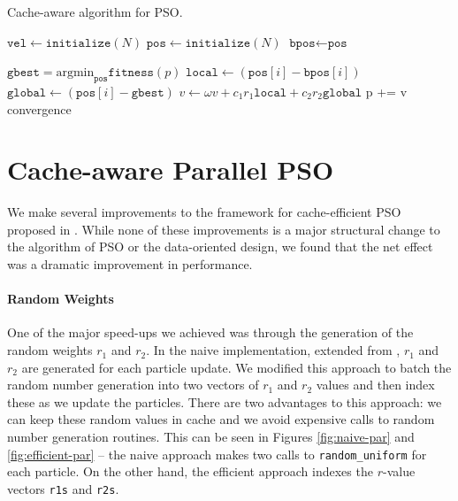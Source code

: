 \begin{algorithm}
  \caption{Cache-aware algorithm for PSO.}\label{alg:pso-cache}
  \begin{algorithmic}[1]
    \State $\texttt{vel} \gets \texttt{initialize}(N)$ 
    \State $\texttt{pos} \gets \texttt{initialize}(N)$ 
    \State $\texttt{bpos} \gets \texttt{pos}$ 

    \Repeat
    \State $\texttt{gbest} = \text{argmin}_{\texttt{pos}}\texttt{fitness}(p)$
    \State $\texttt{local} \gets (\texttt{pos}[i] -
    \texttt{bpos}[i])$
    \State $\texttt{global} \gets  (\texttt{pos}[i]
    - \texttt{gbest})$
    \State $v \gets \omega v + c_1 r_1 \texttt{local}  + c_2 r_2 \texttt{global}$
    \EndFor
    \State p += v
    \EndFor
    \Until convergence
    \EndProcedure
  \end{algorithmic}
\end{algorithm}

\section{Cache-aware Parallel PSO}\label{sec:algo}
We make several improvements to the framework for cache-efficient PSO proposed
in \cite{cache-pso}. While none of these improvements is a major structural
change to the algorithm of PSO or the data-oriented design, we found that the
net effect was a dramatic improvement in performance.

\paragraph{Random Weights} One of the major speed-ups we achieved was through
the generation of the random weights $r_1$ and $r_2$. In the naive
implementation, extended from \cite{cache-pso}, $r_1$ and $r_2$ are generated
for each particle update. We modified this approach to batch the random number
generation into two vectors of $r_1$ and $r_2$ values and then index these as we
update the particles. There are two advantages to this approach: we can keep
these random values in cache and we avoid expensive calls to random number
generation routines. This can be seen in Figures \ref{fig:naive-par} and
\ref{fig:efficient-par} -- the naive approach makes two calls to
\texttt{random\_uniform} for each particle. On the other hand, the efficient
approach indexes the $r$-value vectors \texttt{r1s} and \texttt{r2s}.

